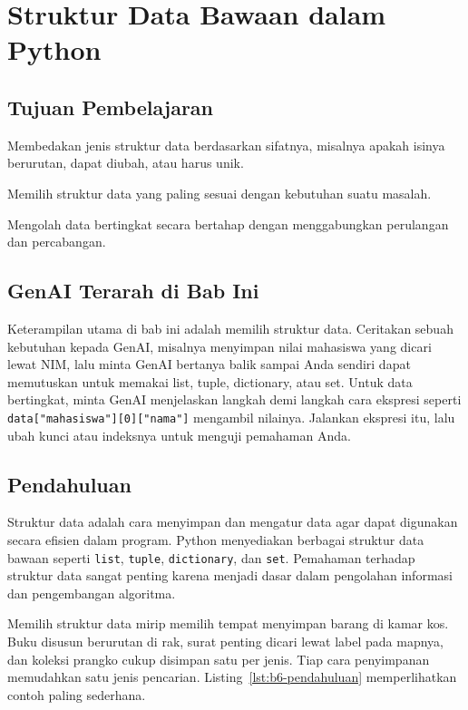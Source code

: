 \chapter{Struktur Data Bawaan dalam Python}

\section*{Tujuan Pembelajaran}
\begin{daftarrapat}
  \item Membedakan jenis struktur data berdasarkan sifatnya, misalnya apakah isinya berurutan, dapat diubah, atau harus unik.
  \item Memilih struktur data yang paling sesuai dengan kebutuhan suatu masalah.
  \item Mengolah data bertingkat secara bertahap dengan menggabungkan perulangan dan percabangan.
\end{daftarrapat}

\section*{GenAI Terarah di Bab Ini}

Keterampilan utama di bab ini adalah memilih struktur data. Ceritakan sebuah kebutuhan kepada GenAI, misalnya menyimpan nilai mahasiswa yang dicari lewat NIM, lalu minta GenAI bertanya balik sampai Anda sendiri dapat memutuskan untuk memakai list, tuple, dictionary, atau set. Untuk data bertingkat, minta GenAI menjelaskan langkah demi langkah cara ekspresi seperti \texttt{data["mahasiswa"][0]["nama"]} mengambil nilainya. Jalankan ekspresi itu, lalu ubah kunci atau indeksnya untuk menguji pemahaman Anda.

\section{Pendahuluan}
Struktur data adalah cara menyimpan dan mengatur data agar dapat digunakan secara efisien dalam program.
Python menyediakan berbagai struktur data bawaan seperti \texttt{list}, \texttt{tuple}, \texttt{dictionary}, dan \texttt{set}.
Pemahaman terhadap struktur data sangat penting karena menjadi dasar dalam pengolahan informasi dan pengembangan algoritma.

Memilih struktur data mirip memilih tempat menyimpan barang di kamar kos. Buku disusun berurutan di rak, surat penting dicari lewat label pada mapnya, dan koleksi prangko cukup disimpan satu per jenis. Tiap cara penyimpanan memudahkan satu jenis pencarian. Listing~\ref{lst:b6-pendahuluan} memperlihatkan contoh paling sederhana.

